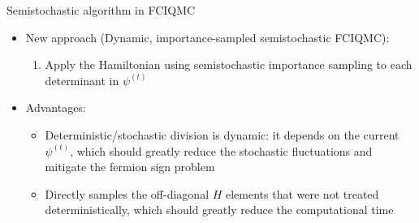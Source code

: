 \documentclass[amsmath]{beamer}
\begin{document}
\begin{frame}{Semistochastic algorithm in FCIQMC}
	\begin{itemize}
		\item New approach (Dynamic, importance-sampled semistochastic FCIQMC):
		\linebreak
		\begin{enumerate}
			\item Apply the Hamiltonian using semistochastic importance sampling to each determinant in $\psi^{(t)}$
			\linebreak
		\end{enumerate}
			
			\item Advantages:
			\linebreak
			\begin{itemize}
				\item Deterministic/stochastic division is dynamic: it depends on the current $\psi^{(t)}$, which should greatly reduce the stochastic fluctuations and mitigate the fermion sign problem
				\linebreak
				\item Directly samples the off-diagonal $H$ elements that were not treated deterministically, which should greatly reduce the computational time
			\end{itemize}
	\end{itemize}	
\end{frame}
\end{document}
